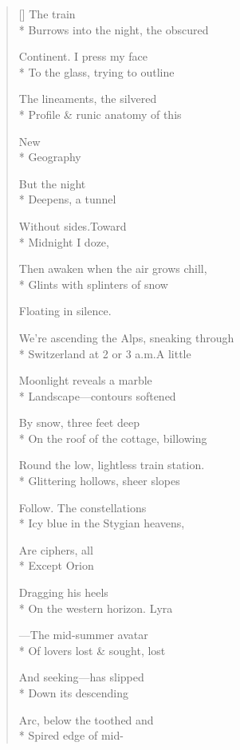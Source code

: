 \label{ch:night_passage}
\settowidth{\versewidth}{We're ascending the Alps, sneaking through}
\begin{verse}[\versewidth]
 \hspace*{2\vgap} The train\\*
Burrows into the night, the obscured

Continent. \qquad I press my face\\*
To the glass, \qquad trying to outline

The lineaments, the silvered\\*
Profile \& runic anatomy of this

New\\*
Geography

But the night\\*
Deepens, a tunnel

Without sides.\qquad Toward\\*
Midnight I doze,

Then awaken when the air grows chill,\\*
Glints with splinters of snow

Floating in silence.

We're ascending the Alps, sneaking through\\*
Switzerland at 2 or 3 a.m.\qquad A little

Moonlight reveals a marble\\*
Landscape---contours softened

By snow, three feet deep\\*
On the roof of the cottage, billowing

Round the low, lightless train station.\\*
Glittering hollows, sheer slopes

Follow. The constellations\\*
Icy blue in the Stygian heavens,

Are ciphers, all\\*
Except Orion

Dragging his heels\\*
On the western horizon. \qquad Lyra

---The mid-summer avatar\\*
Of lovers lost \& sought, lost

And seeking---has slipped\\*
Down its descending

Arc, below the toothed and\\*
Spired edge of mid-


\end{verse}
